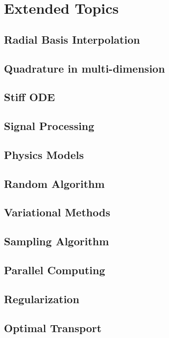 \chapter{Extended Topics}

\section{Radial Basis Interpolation}

\section{Quadrature in multi-dimension}

\section{Stiff ODE}
\section{Signal Processing}
\section{Physics Models}

\section{Random Algorithm}

\section{Variational Methods}

\section{Sampling Algorithm}

\section{Parallel Computing}

\section{Regularization}

\section{Optimal Transport}
\newpage

